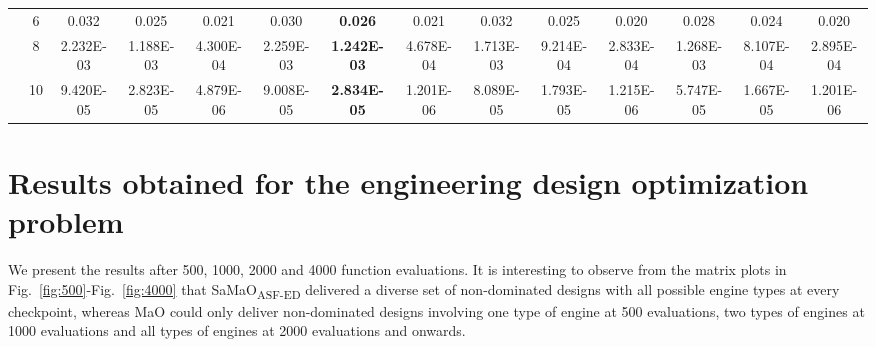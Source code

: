 \documentclass[onecolumn,10pt]{asme2ej}
\begin{document}
\begin{table}[!htb]
\begin{tabular}{|c|c|c|c|c|c|c|c|c|c|c|c|c|c|}
	& 6          & 0.032         & 0.025              & 0.021          & 0.030         & \textbf{0.026}     & 0.021          & 0.032         & 0.025              & 0.020          & 0.028         & 0.024              & 0.020          \\ \cline{2-14} 
	& 8          & 2.232E-03     & 1.188E-03          & 4.300E-04      & 2.259E-03     & \textbf{1.242E-03} & 4.678E-04      & 1.713E-03     & 9.214E-04          & 2.833E-04      & 1.268E-03     & 8.107E-04          & 2.895E-04      \\ \cline{2-14} 
	& 10         & 9.420E-05     & 2.823E-05          & 4.879E-06      & 9.008E-05     & \textbf{2.834E-05} & 1.201E-06      & 8.089E-05     & 1.793E-05          & 1.215E-06      & 5.747E-05     & 1.667E-05          & 1.201E-06      \\ \hline
\end{tabular}
\end{table}

\clearpage

\section{Results obtained for the engineering design optimization problem}

We present the results after 500, 1000, 2000 and 4000 function evaluations. It is interesting to observe from the matrix plots in Fig.~\ref{fig:500}-Fig.~\ref{fig:4000} that SaMaO\textsubscript{ASF-ED} delivered a diverse set of non-dominated designs with all possible engine types at every checkpoint, whereas MaO could only deliver non-dominated designs involving one type of engine at 500 evaluations, two types of engines at 1000 evaluations and all types of engines at 2000 evaluations and onwards. 
\end{document}
